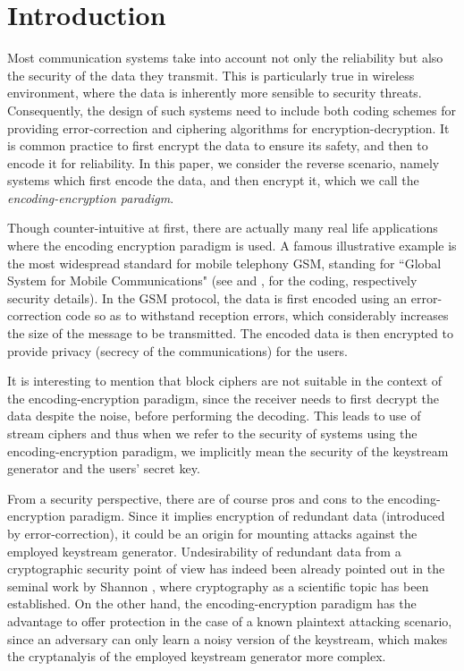 \documentclass{article}[11pt]
\begin{document}
\section{Introduction}

Most communication systems take into account not only the reliability
but also the security of the data they transmit. This is particularly
true in wireless environment, where the data is inherently more sensible
to security threats. Consequently, the design of such systems need to
include both coding schemes for providing error-correction and
ciphering algorithms for encryption-decryption. It is common practice to first
encrypt the data to ensure its safety, and then to encode it for reliability.
In this paper, we consider the reverse scenario, namely systems which first
encode the data, and then encrypt it, which we call the
{\em encoding-encryption paradigm}.

Though counter-intuitive at first, there are actually many real
life applications where the encoding encryption paradigm is used.
A famous illustrative example is the most widespread standard for
mobile telephony GSM, standing for ``Global System for Mobile
Communications" (see \cite{GSM-coding} and \cite{GSM-encryption},
for the coding, respectively security details). In the GSM
protocol, the data is first encoded using an error-correction code
so as to withstand reception errors, which considerably increases
the size of the message to be transmitted. The encoded data is
then encrypted to provide privacy (secrecy of the communications)
for the users.

It is interesting to mention that block ciphers are not suitable
in the context of the encoding-encryption paradigm, since the
receiver needs to first decrypt the data despite the noise, before
performing the decoding. This leads to use of stream ciphers and
thus when we refer to the security of systems using the
encoding-encryption paradigm, we implicitly mean the security of
the keystream generator and the users' secret key.

From a security perspective, there are of course pros and cons to
the encoding-encryption paradigm. Since it implies encryption of
redundant data (introduced by error-correction), it could be an
origin for mounting attacks against the employed keystream
generator. Undesirability of redundant data from a cryptographic
security point of view has indeed been already pointed out in the
seminal work by Shannon \cite{shannon}, where cryptography as a
scientific topic has been established. On the other hand, the
encoding-encryption paradigm has the advantage to offer protection
in the case of a known plaintext attacking scenario, since an
adversary can only learn a noisy version of the keystream, which
makes the cryptanalyis of the employed keystream generator more
complex.
\end{document}

